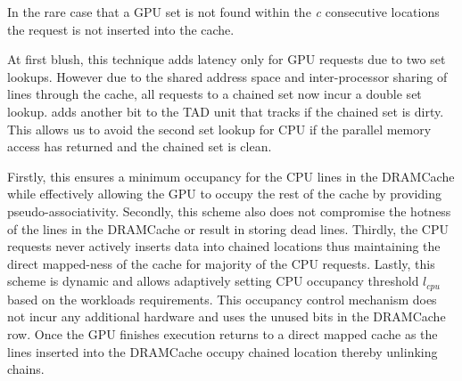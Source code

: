 In the rare case that a GPU set is not found within the \textit{c} consecutive locations the request is not inserted into the cache.
\par At first blush, this technique adds latency only for GPU requests due to two set lookups. However due to the shared address space and inter-processor sharing of lines through the cache, all requests to a chained set now incur a double set lookup. \cachename adds another bit to the TAD unit that tracks if the chained set is dirty. This allows us to avoid the second set lookup for CPU if the parallel memory access has returned and the chained set is clean. 
\par Firstly, this ensures a minimum occupancy for the CPU lines in the DRAMCache while effectively allowing the GPU to occupy the rest of the cache by providing pseudo-associativity. Secondly, this scheme also does not compromise the hotness of the lines in the DRAMCache or result in storing dead lines. Thirdly, the CPU requests never actively inserts data into chained locations thus maintaining the direct mapped-ness of the cache for majority of the CPU requests. Lastly, this scheme is dynamic and allows adaptively setting CPU occupancy threshold \textit{$l_{cpu}$} based on the workloads requirements. This occupancy control mechanism does not incur any additional hardware and uses the unused bits in the DRAMCache row. Once the GPU finishes execution \cachename returns to a direct mapped cache as the lines inserted into the DRAMCache occupy chained location thereby unlinking chains. 
